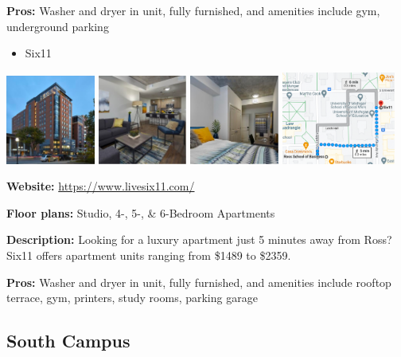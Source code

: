 \documentclass[
]{book}
\providecommand{\tightlist}{%
  \setlength{\itemsep}{0pt}\setlength{\parskip}{0pt}}
\begin{document}
\textbf{Pros:} Washer and dryer in unit, fully furnished, and amenities include gym, underground parking

\begin{itemize}
\tightlist
\item
  Six11
\end{itemize}

\includegraphics[width=0.22\textwidth,height=\textheight]{611_exterior.png}
\includegraphics[width=0.22\textwidth,height=\textheight]{611_interior1.png}
\includegraphics[width=0.22\textwidth,height=\textheight]{611_interior2.png}
\includegraphics[width=0.28\textwidth,height=\textheight]{611_map.png}

\textbf{Website:} \url{https://www.livesix11.com/}

\textbf{Floor plans:} Studio, 4-, 5-, \& 6-Bedroom Apartments

\textbf{Description:} Looking for a luxury apartment just 5 minutes away from Ross? Six11 offers apartment units ranging from \$1489 to \$2359.

\textbf{Pros:} Washer and dryer in unit, fully furnished, and amenities include rooftop terrace, gym, printers, study rooms, parking garage

\hypertarget{south-campus}{%
\subsection{South Campus}\label{south-campus}}
\end{document}
